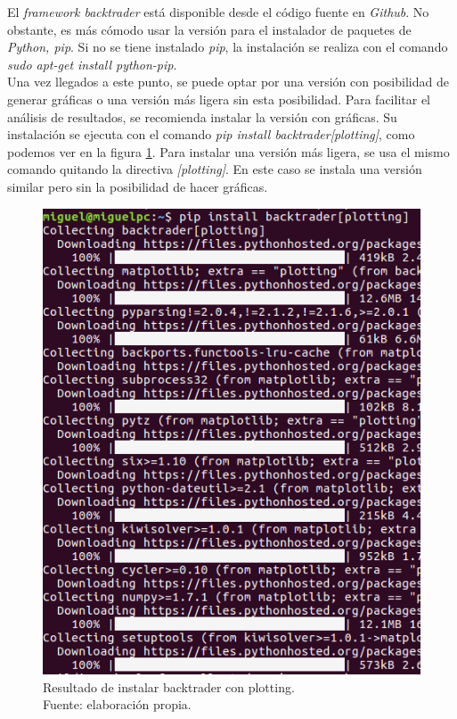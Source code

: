 		El \textit{framework backtrader} est\'a disponible desde el c\'odigo fuente en \textit{Github}. No obstante, es m\'as c\'omodo usar la versi\'on para el instalador de paquetes de \textit{Python, pip}. Si no se tiene instalado \textit{pip}, la instalaci\'on se realiza con el comando \textit{sudo apt-get install python-pip}.\\
		
		Una vez llegados a este punto, se puede optar por una versi\'on con posibilidad de generar gr\'aficas o una versi\'on m\'as ligera sin esta posibilidad. Para facilitar el an\'alisis de resultados, se recomienda instalar la versi\'on con gr\'aficas. Su instalaci\'on se ejecuta con el comando \textit{pip install backtrader[plotting]}, como podemos ver en la figura \ref{fig:pip_backtrader}. Para instalar una versi\'on m\'as ligera, se usa el mismo comando quitando la directiva \textit{[plotting]}. En este caso se instala una versi\'on similar pero sin la posibilidad de hacer gr\'aficas.\\
		
		\begin{figure}[H]
			\centering
			\includegraphics[scale=0.4]{imagenes/pip_backtrader.png}
			\caption[Resultado de instalar backtrader con plotting]{Resultado de instalar backtrader con plotting.\\ Fuente: elaboraci\'on propia.}
			\label{fig:pip_backtrader}
		\end{figure}
		
